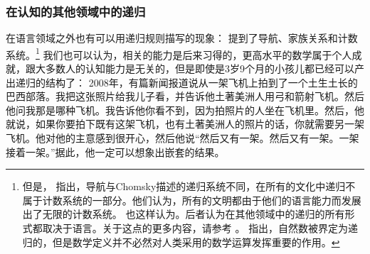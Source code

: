 \subsubsection{在认知的其他领域中的递归}

在语言领域之外也有可以用递归规则描写的现象： \citet*[]{HCF2002a}提到了导航、家族关系和计数系统。\footnote{\label{fn-Rekursion-Mathematik}%
但是， \citet[]{PJ2005a}指出，导航与Chomsky描述的递归系统不同，在所有的文化中递归不属于计数系统的一部分。他们认为，所有的文明都由于他们的语言能力而发展出了无限的计数系统。 \citet*[]{FHC2005a}也这样认为。后者认为在其他领域中的递归的所有形式都取决于语言。关于这点的更多内容，请参考 。 \citet{LL2011a}指出，自然数被界定为递归的，但是数学定义并不必然对人类采用的数学运算发挥重要的作用。
}
我们也可以认为，相关的能力是后来习得的，更高水平的数学属于个人成就，跟大多数人的认知能力是无关的，但是即使是3岁9个月的小孩儿都已经可以产出递归的结构了：
2008年，有篇新闻报道说从一架飞机上拍到了一个土生土长的巴西部落。我把这张照片给我儿子看，并告诉他土著美洲人用弓和箭射飞机。然后他问我那是哪种飞机。我告诉他你看不到，因为拍照片的人坐在飞机里。然后，他就说，如果你要拍下既有这架飞机，也有土著美洲人的照片的话，你就需要另一架飞机。他对他的主意感到很开心，然后他说“然后又有一架。然后又有一架。一架接着一架。”据此，他一定可以想象出嵌套的结果。
